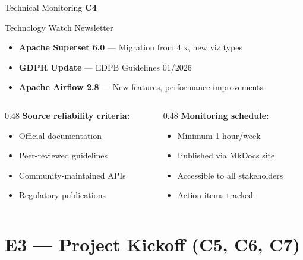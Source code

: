 \documentclass[aspectratio=169, 10pt]{beamer}
\newcommand{\competency}[1]{\textbf{\color{ntblue}#1}}
\begin{document}
\begin{frame}{Technical Monitoring \competency{C4}}
\begin{block}{Technology Watch Newsletter}
  \begin{itemize}
    \item \textbf{Apache Superset 6.0} --- Migration from 4.x, new viz types
    \item \textbf{GDPR Update} --- EDPB Guidelines 01/2026
    \item \textbf{Apache Airflow 2.8} --- New features, performance improvements
  \end{itemize}
\end{block}

\vspace{0.3cm}
\begin{columns}[T]
\begin{column}{0.48\textwidth}
  \textbf{Source reliability criteria:}
  \begin{itemize}\small
    \item Official documentation
    \item Peer-reviewed guidelines
    \item Community-maintained APIs
    \item Regulatory publications
  \end{itemize}
\end{column}
\begin{column}{0.48\textwidth}
  \textbf{Monitoring schedule:}
  \begin{itemize}\small
    \item Minimum 1 hour/week
    \item Published via MkDocs site
    \item Accessible to all stakeholders
    \item Action items tracked
  \end{itemize}
\end{column}
\end{columns}

\end{frame}

\section{E3 --- Project Kickoff (C5, C6, C7)}
\end{document}
